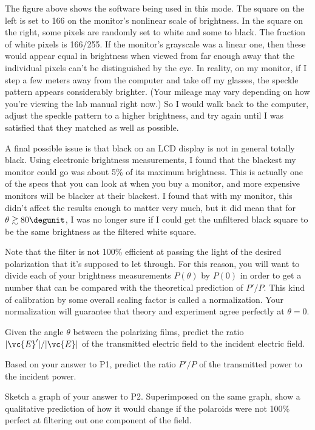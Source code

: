
The figure above shows the software being used in this mode. The square on the left
is set to 166 on the monitor's nonlinear scale of brightness. In the square on the right,
some pixels are randomly set to white and some to black. The fraction of white pixels
is 166/255. If the monitor's grayscale was a linear one, then these would appear
equal in brightness when viewed from far enough away that the individual pixels can't
be distinguished by the eye. In reality, on my monitor, if I step a few meters away from the computer and
take off my glasses, the speckle pattern appears considerably brighter. (Your mileage may
vary depending on how you're viewing the lab manual right now.) So I would walk back to the
computer, adjust the speckle pattern to a higher brightness, and try again until I was
satisfied that they matched as well as possible.

A final possible issue is that black on an LCD display is not in general totally black.
Using electronic brightness measurements, I found that the blackest my monitor could go
was about 5\% of its maximum brightness. This is actually one of the specs that you can
look at when you buy a monitor, and more expensive monitors will be blacker at their blackest.
I found that with my monitor, this didn't affect the results enough to matter very much,
but it did mean that for $\theta\gtrsim 80\degunit$, I was no longer sure if I could
get the unfiltered black square to be the same brightness as the filtered white square.

Note that the filter is not 100\% efficient at passing the light of the desired polarization
that it's supposed to let through. For this reason, you will want to divide each of your
brightness measurements $P(\theta)$ by $P(0)$ in order to get a number that can be
compared with the theoretical prediction of $P'/P$. This kind of calibration by
some overall scaling factor is called a normalization. Your normalization will guarantee
that theory and experiment agree perfectly at $\theta=0$.

\prelab

\prelabquestion Given the angle $\theta$ between the polarizing films, predict the 
ratio $|\vc{E}'|/|\vc{E}|$ of the transmitted electric field to the incident
electric field.

\prelabquestion Based on your answer to P1, predict the ratio $P'/P$ of the transmitted
power to the incident power.

\prelabquestion Sketch a graph of your answer to P2. Superimposed on the same graph, show
a qualitative prediction of how it would change if the polaroids were not
100\% perfect at filtering out one component of the field.

